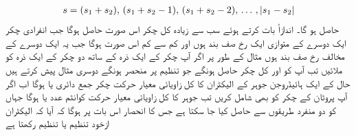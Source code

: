 \begin{align}
s=(s_1+s_2), \,(s_1+s_2-1),\, (s_1+s_2-2), \,\dotsc \, , \,\abs{s_1-s_2}
\end{align}
حاصل ہو گا۔ اندازاً بات کرتے ہوئے سب سے زیادہ کل چکر اس صورت حاصل ہوگا جب انفرادی چکر ایک دوسرے کے متوازی ایک رخ صف بند ہوں اور کم سے کم اس صورت ہوگا جب یہ ایک دوسرے کے مخالف رخ صف بند ہوں مثال کے طور پر اگر آپ  چکر کے ایک ذرہ کے ساتھ دو چکر کے ایک ذرہ کو ملائیں تب آپ کو    اور  کل چکر حاصل ہونگے جو تنظیم پر منحصر ہونگے دوسری مثال پیش کرتے ہیں حال  کے ایک ہائیڈروجن جوہر کے الیکٹران کا کل زاویائی معیار حرکت چکر جمع دائری  یا  ہوگا اب اگر آپ پروٹان کے چکر کو بھی شامل کریں تب جوہر کا کل زاویائی معیار حرکت کوانٹم عدد   یا  ہوگا جہاں  کو دو منفرد طریقوں سے حاصل کیا جا سکتا ہے جس کا انحصار اس بات پر ہوگا کہ آیا کہ الیکٹران ازخود  تنظیم یا  تنظیم رکھتا ہے


